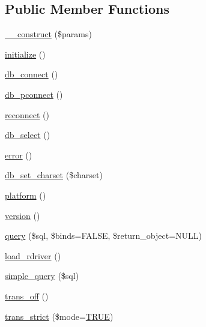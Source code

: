 \subsection*{Public Member Functions}
\begin{DoxyCompactItemize}
\item 
\mbox{\hyperlink{class_c_i___d_b__driver_a9162320adff1a1a4afd7f2372f753a3e}{\+\_\+\+\_\+construct}} (\$params)
\item 
\mbox{\hyperlink{class_c_i___d_b__driver_a91098fa7d1917ce4833f284bbef12627}{initialize}} ()
\item 
\mbox{\hyperlink{class_c_i___d_b__driver_a6aa545dcb7768f0b62d37cdcf7f09adc}{db\+\_\+connect}} ()
\item 
\mbox{\hyperlink{class_c_i___d_b__driver_a0f69e662bd02de5bcf98647068e7c653}{db\+\_\+pconnect}} ()
\item 
\mbox{\hyperlink{class_c_i___d_b__driver_a57c19c642ab3023e28d10c50f86ff0a8}{reconnect}} ()
\item 
\mbox{\hyperlink{class_c_i___d_b__driver_af0c7f2602586ea2050b19fb36baefb24}{db\+\_\+select}} ()
\item 
\mbox{\hyperlink{class_c_i___d_b__driver_a43b8d30b879d4f09ceb059b02af2bc02}{error}} ()
\item 
\mbox{\hyperlink{class_c_i___d_b__driver_a66d47c23180629f6ccea934fd2ab6d0e}{db\+\_\+set\+\_\+charset}} (\$charset)
\item 
\mbox{\hyperlink{class_c_i___d_b__driver_ad69bddb2ba31b27415484b3da4213ba8}{platform}} ()
\item 
\mbox{\hyperlink{class_c_i___d_b__driver_a6080dae0886626b9a4cedb29240708b1}{version}} ()
\item 
\mbox{\hyperlink{class_c_i___d_b__driver_a4711d63638a755f763352472063f0bbf}{query}} (\$sql, \$binds=F\+A\+L\+SE, \$return\+\_\+object=N\+U\+LL)
\item 
\mbox{\hyperlink{class_c_i___d_b__driver_a0bd509a0088f09f4bbfbcbbe78bc3547}{load\+\_\+rdriver}} ()
\item 
\mbox{\hyperlink{class_c_i___d_b__driver_a6ac4d82d7ba4e8df07e1367229084c91}{simple\+\_\+query}} (\$sql)
\item 
\mbox{\hyperlink{class_c_i___d_b__driver_ae9080ca6b0a9a258f5e87750b266e337}{trans\+\_\+off}} ()
\item 
\mbox{\hyperlink{class_c_i___d_b__driver_a648f8e6b3d0c53ce2afd63cfcea1fe74}{trans\+\_\+strict}} (\$mode=\mbox{\hyperlink{constants_8php_ae04a3efe6aa42044f803ee90c2277846}{T\+R\+UE}})
\item 

\end{DoxyCompactItemize}

